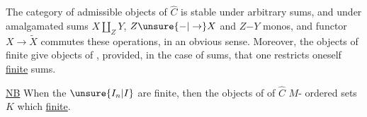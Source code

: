 The category of admissible objects of $\widehat C$ is stable under  arbitrary sums, and under amalgamated sums $X\amalg_Z Y$,  $Z\unsure{\mathord{-}|\to}X$ and $Z\mathord{-}Y$ monos, and  functor $X\to\widetilde X$ commutes  these operations, in an obvious sense. Moreover, the objects of finite  give objects of , provided, \unsure{(}in the case of sums\unsure{)|,}, that one restricts oneself  \uline{finite} sums.

\uline{NB} When the $\unsure{I_n|I}$ are finite, then the  objects of  of $\widehat C$   $M$- ordered sets $K$ which  \uline{finite}.

